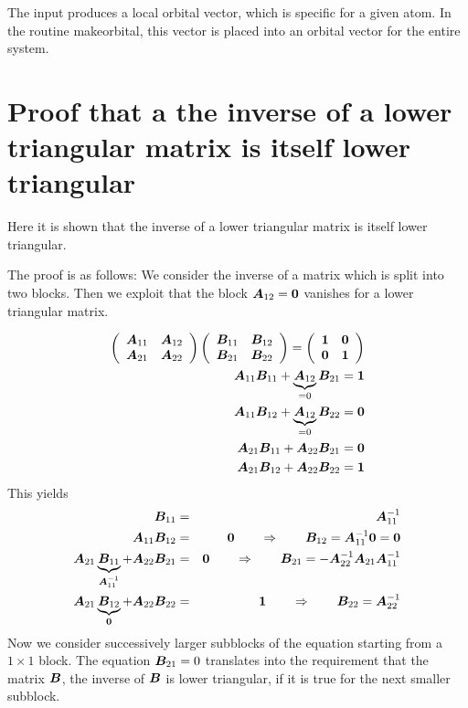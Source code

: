 \documentclass[11pt,a4paper]{report}
\begin{document}
The input produces a local orbital vector, which is specific for a
given atom. In the routine makeorbital, this vector is placed into an
orbital vector for the entire system.



\appendix
\chapter{Proof that a the inverse of a 
lower triangular matrix is itself lower triangular}
\label{app:prooflowertriangularinverse}
Here it is shown that the inverse of a lower triangular matrix is
itself lower triangular.

The proof is as follows: We consider the inverse of a
matrix which is split into two blocks. Then we exploit that the block
$\bm{A}_{12}=\bm{0}$ vanishes for a lower triangular matrix.

\begin{eqnarray}
\left(\begin{array}{cc} \bm{A}_{11}&\bm{A}_{12}\\\bm{A}_{21}&\bm{A}_{22}\end{array}\right)
\left(\begin{array}{cc} \bm{B}_{11}&\bm{B}_{12}\\\bm{B}_{21}&\bm{B}_{22}\end{array}\right)
=\left(\begin{array}{cc} \bm{1}&\bm{0}\\\bm{0}&\bm{1}\end{array}\right)
\nonumber\\
\bm{A}_{11}\bm{B}_{11}+\underbrace{\bm{A}_{12}}_{=0}\bm{B}_{21}=\bm{1}
\nonumber\\
\bm{A}_{11}\bm{B}_{12}+\underbrace{\bm{A}_{12}}_{=0}\bm{B}_{22}=\bm{0}
\nonumber\\
\bm{A}_{21}\bm{B}_{11}+\bm{A}_{22}\bm{B}_{21}=\bm{0}
\nonumber\\
\bm{A}_{21}\bm{B}_{12}+\bm{A}_{22}\bm{B}_{22}=\bm{1}
\end{eqnarray}
This yields
\begin{eqnarray}
\bm{B}_{11}&=&\bm{A}_{11}^{-1}
\nonumber\\
\bm{A}_{11}\bm{B}_{12}&=&\bm{0}
\qquad\Rightarrow\qquad
\bm{\bm{B}}_{12}=\bm{\bm{A}}_{11}^{-1}\bm{0}=\bm{0}
\nonumber\\
\bm{A}_{21}\underbrace{\bm{B}_{11}}_{\bm{A}_{11}^{-1}}
+\bm{A}_{22}\bm{B}_{21}&=&\bm{0}
\qquad\Rightarrow\qquad
\bm{B}_{21}=-\bm{A}_{22}^{-1}\bm{A}_{21}\bm{A}_{11}^{-1}
\nonumber\\
\bm{A}_{21}\underbrace{\bm{B}_{12}}_{\bm{0}}+\bm{A}_{22}\bm{B}_{22}&=&\bm{1}
\qquad\Rightarrow\qquad
\bm{B}_{22}=\bm{A}_{22}^{-1}
\end{eqnarray}
Now we consider successively larger subblocks of the equation starting
from a $1\times1$ block. The equation $\bm{B}_{21}=0$ translates into
the requirement that the matrix $\bm{B}$, the inverse of $\bm{B}$ is
lower triangular, if it is true for the next smaller subblock.


 
\end{document}
